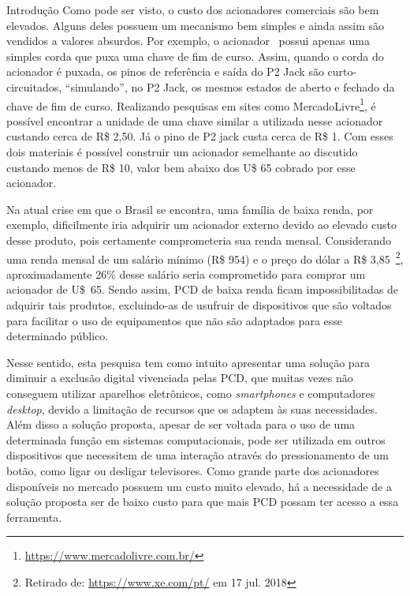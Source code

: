 \begin{chapter}{Introdução}
Como pode ser visto, o custo dos acionadores comerciais são bem elevados. Alguns
deles possuem um mecanismo bem simples e ainda assim são vendidos a valores
absurdos. Por exemplo, o acionador~\cite{StringSwitch} possui apenas uma simples
corda que puxa uma chave de fim de curso. Assim, quando o corda do acionador é
puxada, os pinos de referência e saída do P2 Jack são curto-circuitados,
``simulando'', no P2 Jack, os mesmos estados de aberto e fechado da chave de fim
de curso. Realizando pesquisas em sites como
MercadoLivre\footnote{\url{https://www.mercadolivre.com.br/}}, é possível
encontrar a unidade de uma chave similar a utilizada nesse acionador custando
cerca de R\$ 2,50. Já o pino de P2 jack custa cerca de R\$ 1. Com esses dois
materiais é possível construir um acionador semelhante ao discutido custando
menos de R\$ 10, valor bem abaixo dos U\$ 65 cobrado por esse acionador. %

Na atual crise em que o Brasil se encontra, uma família de baixa renda, por
exemplo, dificilmente iria adquirir um acionador externo devido ao elevado custo
desse produto, pois certamente comprometeria sua renda mensal.  Considerando uma
renda mensal de um salário mínimo  (R\$ 954) e o preço do dólar a R\$
3,85~\footnote{Retirado de: \url{https://www.xe.com/pt/} em 17 jul. 2018},
aproximadamente 26\% desse salário seria comprometido para comprar um acionador
de U\$~65. Sendo assim, PCD de baixa renda ficam impossibilitadas de adquirir
tais produtos, excluindo-as de usufruir de dispositivos que são voltados para
facilitar o uso de equipamentos que não são adaptados para esse determinado
público. %

Nesse sentido, esta pesquisa tem como intuito apresentar uma solução para
diminuir a exclusão digital vivenciada pelas PCD, que muitas vezes não conseguem
utilizar aparelhos eletrônicos, como \textit{smartphones} e computadores
\textit{desktop}, devido a limitação de recursos que os adaptem às suas
necessidades. Além disso a solução proposta, apesar de ser voltada para o uso de
uma determinada função em sistemas computacionais, pode ser utilizada em outros
dispositivos que necessitem de uma interação através do pressionamento de um
botão, como ligar ou desligar televisores. Como grande parte dos acionadores
disponíveis no mercado possuem um custo muito elevado, há a necessidade de a
solução proposta ser de baixo custo para que mais PCD possam ter
acesso a essa ferramenta. 

 

\end{chapter}
